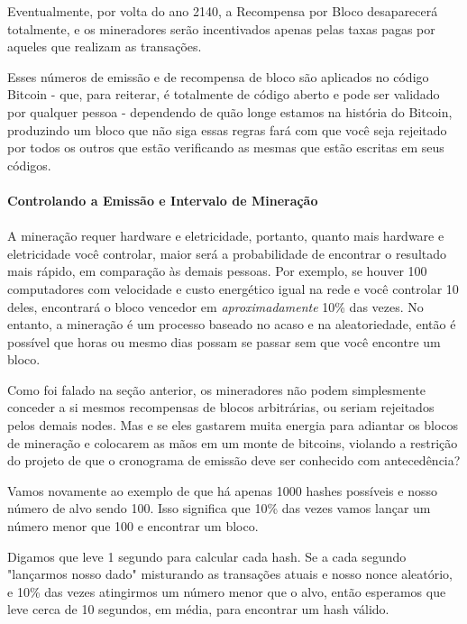 Eventualmente, por volta do ano 2140, a Recompensa por Bloco desaparecerá totalmente, e os mineradores serão incentivados apenas pelas taxas pagas por aqueles que realizam as transações.

Esses números de emissão e de recompensa de bloco são aplicados no código Bitcoin - que, para reiterar, é totalmente de código aberto e pode ser validado por qualquer pessoa - dependendo de quão longe estamos na história do Bitcoin, produzindo um bloco que não siga essas regras fará com que você seja rejeitado por todos os outros que estão verificando as mesmas que estão escritas em seus códigos.

\paragraph{Controlando a Emissão e Intervalo de Mineração}
\paragraph{}

A mineração requer hardware e eletricidade, portanto, quanto mais hardware e eletricidade você controlar, maior será a probabilidade de encontrar o resultado mais rápido, em comparação às demais pessoas. Por exemplo, se houver 100 computadores com velocidade e custo energético igual na rede e você controlar 10 deles, encontrará o bloco vencedor em \textit{aproximadamente} 10\% das vezes. No entanto, a mineração é um processo baseado no acaso e na aleatoriedade, então é possível que horas ou mesmo dias possam se passar sem que você encontre um bloco.

Como foi falado na seção anterior, os mineradores não podem simplesmente conceder a si mesmos recompensas de blocos arbitrárias, ou seriam rejeitados pelos demais nodes. Mas e se eles gastarem muita energia para adiantar os blocos de mineração e colocarem as mãos em um monte de bitcoins, violando a restrição do projeto de que o cronograma de emissão deve ser conhecido com antecedência?

Vamos novamente ao exemplo de que há apenas 1000 hashes possíveis e nosso número de alvo sendo 100. Isso significa que 10\% das vezes vamos lançar um número menor que 100 e encontrar um bloco.

Digamos que leve 1 segundo para calcular cada hash. Se a cada segundo "lançarmos nosso dado" misturando as transações atuais e nosso nonce aleatório, e 10\% das vezes atingirmos um número menor que o alvo, então esperamos que leve cerca de 10 segundos, em média, para encontrar um hash válido.

